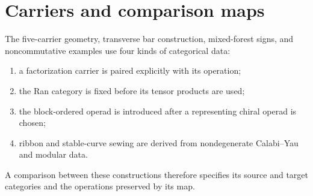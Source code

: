 \chapter{Carriers and comparison maps}
The five-carrier geometry, transverse bar construction, mixed-forest signs, and noncommutative examples use four kinds of categorical data:
\begin{enumerate}
\item a factorization carrier is paired explicitly with its operation;
\item the Ran category is fixed before its tensor products are used;
\item the block-ordered operad is introduced after a representing chiral operad is chosen;
\item ribbon and stable-curve sewing are derived from nondegenerate Calabi--Yau and modular data.
\end{enumerate}
A comparison between these constructions therefore specifies its source and target categories and the operations preserved by its map.

